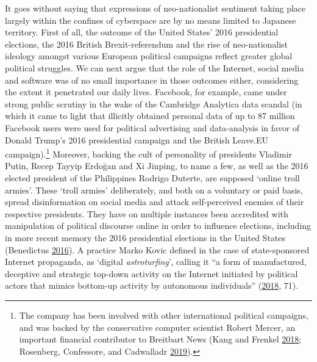 \documentclass[10pt,british,A4paper,,openany]{memoir}
\begin{document}
It goes without saying that expressions of neo-nationalist sentiment
taking place largely within the confines of cyberspace are by no means
limited to Japanese territory. First of all, the outcome of the United
States' 2016 presidential elections, the 2016 British Brexit-referendum
and the rise of neo-nationalist ideology amongst various European
political campaigns reflect greater global political struggles. We can
next argue that the role of the Internet, social media and software was
of no small importance in those outcomes either, considering the extent
it penetrated our daily lives. Facebook, for example, came under strong
public scrutiny in the wake of the Cambridge Analytica data scandal (in
which it came to light that illicitly obtained personal data of up to 87
million Facebook users were used for political advertising and
data-analysis in favor of Donald Trump's 2016 presidential campaign and
the British Leave.EU campaign).\footnote{The company has been involved
  with other international political campaigns, and was backed by the
  conservative computer scientist Robert Mercer, an important financial
  contributor to Breitbart News (Kang and Frenkel
  \protect\hyperlink{ref-kang_facebook_2018}{2018}; Rosenberg,
  Confessore, and Cadwalladr
  \protect\hyperlink{ref-rosenberg_how_2019}{2019}).} Moreover, backing
the cult of personality of presidents Vladimir Putin, Recep Tayyip
Erdoğan and Xi Jinping, to name a few, as well as the 2016 elected
president of the Philippines Rodrigo Duterte, are supposed `online troll
armies'. These `troll armies' deliberately, and both on a voluntary or
paid basis, spread disinformation on social media and attack
self-perceived enemies of their respective presidents. They have on
multiple instances been accredited with manipulation of political
discourse online in order to influence elections, including in more
recent memory the 2016 presidential elections in the United States
(Benedictus \protect\hyperlink{ref-benedictus_invasion_2016}{2016}). A
practice Marko Kovic defined in the case of state-sponsored Internet
propaganda, as `digital \emph{astroturfing}', calling it ``a form of
manufactured, deceptive and strategic top-down activity on the Internet
initiated by political actors that mimics bottom-up activity by
autonomous individuals''
(\protect\hyperlink{ref-kovic_digital_2018}{2018}, 71).
\end{document}
